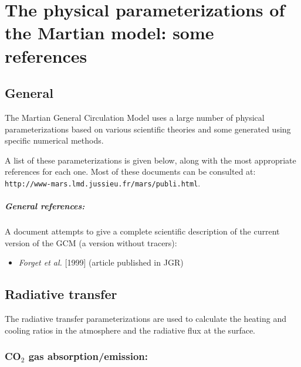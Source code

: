 \chapter{The physical parameterizations of the Martian model: some references}

\label{sc:phymars}

\section{General}

The Martian General Circulation Model uses a large number of physical
parameterizations based on various scientific theories
and some generated using specific numerical methods.

A list of these parameterizations is given below, along with the most
appropriate
references for each one. Most of these documents can be consulted at:
\verb+http://www-mars.lmd.jussieu.fr/mars/publi.html+.


\paragraph{General references:}
A document attempts to give a complete scientific description of the current
version of the GCM (a version without tracers): 
\begin{itemize}
\item  {\it Forget et al.} [1999] (article
published in JGR) 
\end{itemize}

\nocite{Forg:99}

\section{Radiative transfer}

The radiative transfer parameterizations are used to calculate the heating
and cooling ratios in the atmosphere and the radiative flux at the surface.

\subsection{\bf CO$_2$ gas absorption/emission:}
